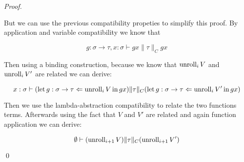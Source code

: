 \begin{proof}
\begin{itemize}
        But we can use the previous compatibility propeties 
        to simplify this proof. By application and variable 
        compatibility we know that 
        
        \begin{equation*}
            g : \sigma \to \tau, x : \sigma \vdash g x \| \tau \|_C g x
        \end{equation*}

        Then using a binding construction, because we know that
        $\Unroll_i V$ and $\Unroll_i V'$ are related we can derive:
        
        \begin{equation*}
            x : \sigma \vdash (\Bind{\Unroll_i V}{g : \sigma \to
                \tau}{g x}) \| \tau \|_C (\Bind{\Unroll_i V'}{g : \sigma
            \to \tau}{g x})
        \end{equation*}
        
        Then we use the lambda-abstraction compatibility to 
        relate the two functions terms.
        Afterwards using the fact that $V$ and $V'$ are related 
        and again function application we can derive:

        \begin{equation*}
            \emptyset \vdash (\Unroll_{i+1} V) \| \tau \|_C
            (\Unroll_{i+1} V')
        \end{equation*}

\end{itemize}
\qed\end{proof}

